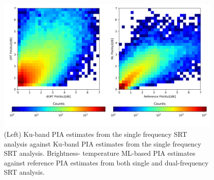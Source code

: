 \documentclass[10pt]{ietbook}
\begin{document}
\begin{figure} \label{fig:ML_PIA}
    \centerline{}
    \includegraphics[width=\textwidth]{ML_PIA.png}
    
    \caption{(Left) Ku-band PIA estimates from the single frequency SRT analysis against Ku-band PIA estimates from the single frequency SRT analysis. Brightness-
    temperature ML-based PIA estimates against reference PIA estimates from both single and dual-frequency SRT analysis.}
\end{figure}
\end{document}
